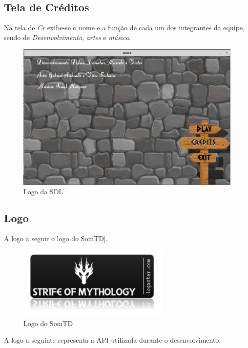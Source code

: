 \documentclass[11pt]{article} %
\begin{document}
\newpage
\subsection{Tela de Créditos}

Na tela de \textit{Cr} exibe-se o nome e a função de cada um dos integrantes da equipe, sendo de \textit{Desenvolvimento}, \textit{artes} e \textit{música}.

\begin{figure}[!htp]
\centering
\includegraphics[scale=0.3]{res/credits_display.png}
\caption{Logo da SDL}
\label{Logo da SDL}
\end{figure}

\newpage

\subsection{Logo}

A logo a seguir o logo do SomTD].
\begin{figure}[!htp]
\centering
\includegraphics[scale=1.1]{res/logo.png}
\caption{Logo do SomTD}
\label{Logo do SomTD}
\end{figure}

A logo a seguinte representa a API utilizada durante o desenvolvimento.
\end{document}
